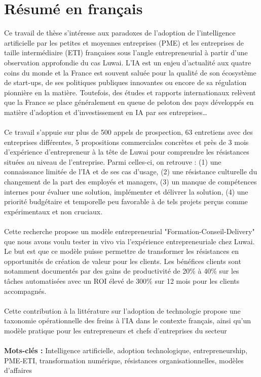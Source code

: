 \section*{Résumé en français}

Ce travail de thèse s'intéresse aux paradoxes de l'adoption de l'intelligence
artificielle par les petites et moyennes entreprises (PME) et les entreprises de
taille intermédiaire (ETI) françaises sous l'angle entrepreneurial à partir d'une
observation approfondie du cas Luwai. L'IA est un enjeu d'actualité aux quatre coins
du monde et la France est souvent saluée pour la qualité de son écosystème de start-ups,
de ses politiques publiques innovantes ou encore de sa régulation pionnière en la matière.
Toutefois, des études et rapports internationaux relèvent que la France se place généralement
en queue de peloton des pays développés en matière d'adoption et d'investissement en IA
par ses entreprises… 
\\\\
Ce travail s’appuie sur plus de 500 appels de prospection, 63 entretiens avec des entreprises différentes, 5 propositions commerciales concrètes et près de 3 mois d’expérience d’entrepreneur à la tête de Luwai pour comprendre les résistances situées au niveau de l'entreprise. Parmi celles-ci, on retrouve : (1) une connaissance limitée de l’IA et de
ses cas d’usage, (2) une résistance culturelle du changement de la part des employés et
managers, (3) un manque de compétences internes pour évaluer une solution, implémenter
et délivrer la solution, (4) une priorité budgétaire et temporelle peu favorable à de tels
projets perçus comme expérimentaux et non cruciaux. 
\\\\
Cette recherche propose un modèle
entrepreneurial "Formation-Conseil-Delivery" que nous avons voulu tester in vivo via
l’expérience entrepreneuriale chez Luwai. Le but est que ce modèle puisse permettre de
transformer les résistances en opportunités de création de valeur pour les clients. Les bénéfices clients sont notamment documentés par des gains de
productivité de 20\% à 40\% sur les tâches automatisées avec un ROI élevé de 300\% sur
12 mois pour les clients accompagnés.
\\\\
Cette contribution à la littérature sur l’adoption de technologie propose une
taxonomie opérationnelle des freins à l’IA dans le contexte français, ainsi qu’un modèle
pratique pour les entrepreneurs et chefs d’entreprises du secteur
\\\\
\textbf{Mots-clés :} Intelligence artificielle, adoption technologique, entrepreneurship, PME-ETI, transformation numérique, résistances organisationnelles, modèles d'affaires



